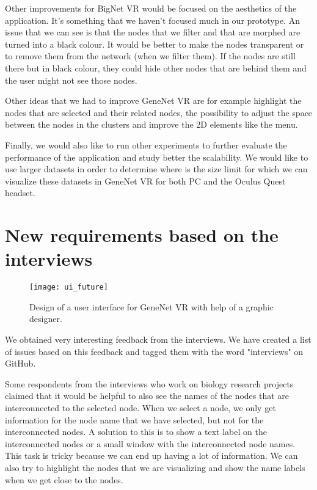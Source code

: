 Other improvements for BigNet VR would be focused on the aesthetics of the application. It's something that we haven't focused much in our prototype. An issue that we can see is that the nodes that we filter and that are morphed are turned into a black colour. It would be better to make the nodes transparent or to remove them from the network (when we filter them). If the nodes are still there but in black colour, they could hide other nodes that are behind them and the user might not see those nodes.

Other ideas that we had to improve GeneNet VR are for example highlight the nodes that are selected and their related nodes, the possibility to adjust the space between the nodes in the clusters and improve the 2D elements like the menu.

Finally, we would also like to run other experiments to further evaluate the performance of the application and study better the scalability. We would like to use larger datasets in order to determine where is the size limit for which we can visualize these datasets in GeneNet VR for both PC and the Oculus Quest headset.

\section{New requirements based on the interviews}
\begin{figure}[h!]
    \setlength{\tempheight}{15ex}
    \centering
    \texttt{[image: ui\_future]}
    \caption{Design of a user interface for GeneNet VR with help of a graphic designer.}
    \label{fig:issues}
\end{figure}

We obtained very interesting feedback from the interviews. We have created a list of issues based on this feedback and tagged them with the word "interviews" on GitHub.

Some respondents from the interviews who work on biology research projects claimed that it would be helpful to also see the names of the nodes that are interconnected to the selected node. When we select a node, we only get information for the node name that we have selected, but not for the interconnected nodes. A solution to this is to show a text label on the interconnected nodes or a small window with the interconnected node names. This task is tricky because we can end up having a lot of information. We can also try to highlight the nodes that we are visualizing and show the name labels when we get close to the nodes.

